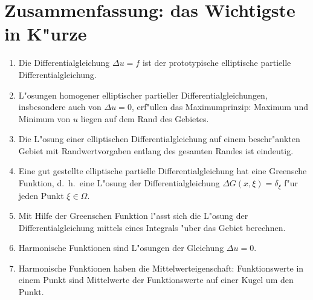 \section{Zusammenfassung: das Wichtigste in K"urze}
\begin{enumerate}
\item Die Differentialgleichung $\Delta u=f$ ist der prototypische
elliptische partielle Differentialgleichung.
\item L"osungen homogener elliptischer partieller Differentialgleichungen,
insbesondere auch von $\Delta u=0$, erf"ullen das Maximumprinzip:
Maximum und Minimum von $u$ liegen auf dem Rand des Gebietes.
\item Die L"osung einer elliptischen Differentialgleichung auf einem
beschr"ankten Gebiet mit Randwertvorgaben entlang des gesamten Randes
ist eindeutig.
\item Eine gut gestellte elliptische partielle Differentialgleichung hat
eine Greensche Funktion, d.~h.~eine L"osung der Differentialgleichung
$\Delta G(x,\xi)=\delta_\xi$ f"ur jeden Punkt $\xi\in\Omega$.
\item Mit Hilfe der Greenschen Funktion l"asst sich die L"osung
der Differentialgleichung mittels eines Integrals "uber das Gebiet
berechnen.
\item Harmonische Funktionen sind L"osungen der Gleichung $\Delta u=0$.
\item Harmonische Funktionen haben die Mittelwerteigenschaft: Funktionswerte
in einem Punkt sind Mittelwerte der Funktionswerte auf einer Kugel
um den Punkt.
\end{enumerate}


